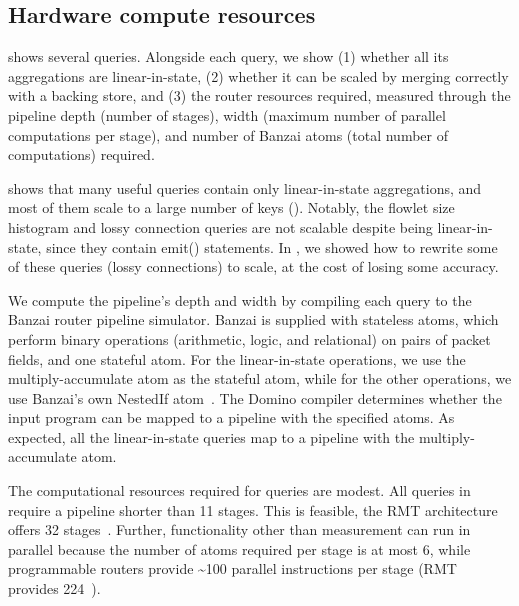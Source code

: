 \subsection{Hardware compute resources}
\label{s:eval:hardware}
\label{sec:eval:hardware}

 shows several \TheSystem queries. Alongside each
query, we show (1) whether all its aggregations are linear-in-state, (2)
whether it can be scaled by merging correctly with a backing store, and (3) the
router resources required, measured through the pipeline depth (number of
stages), width (maximum number of parallel computations per stage), and
number of Banzai atoms (total number of computations) required.
%
%

 shows that many useful queries contain only
linear-in-state aggregations, and most of them scale to a large number of keys
(). Notably, the flowlet size histogram and
lossy connection queries are not scalable despite being linear-in-state, since
they contain {\ct emit()} statements.  In , we
showed how to rewrite some of these queries (\eg lossy connections) to scale, at
the cost of losing some accuracy.

We compute the pipeline's depth and width by compiling each query to the Banzai
router pipeline simulator. Banzai is supplied
with stateless atoms, which perform binary operations (arithmetic, logic, and
relational) on pairs of packet fields, and one stateful atom. For the
linear-in-state operations, we use the multiply-accumulate atom as the stateful
atom, while for the other operations, we use Banzai's own NestedIf atom~\cite{domino_sigcomm}. The Domino compiler determines whether the input
program can be mapped to a pipeline with the specified atoms. As expected, all
the linear-in-state queries map to a pipeline with the multiply-accumulate
atom.

The computational resources required for \TheSystem queries are modest.  All
queries in  require a pipeline shorter than 11 stages.
This is feasible, \eg the
RMT architecture offers 32 stages~\cite{rmt}. Further, functionality other than
measurement can run in parallel
because the number of atoms required per stage is at most 6, while
programmable routers provide \textasciitilde{}100 parallel instructions per stage
(\eg RMT provides 224~\cite{rmt}).

